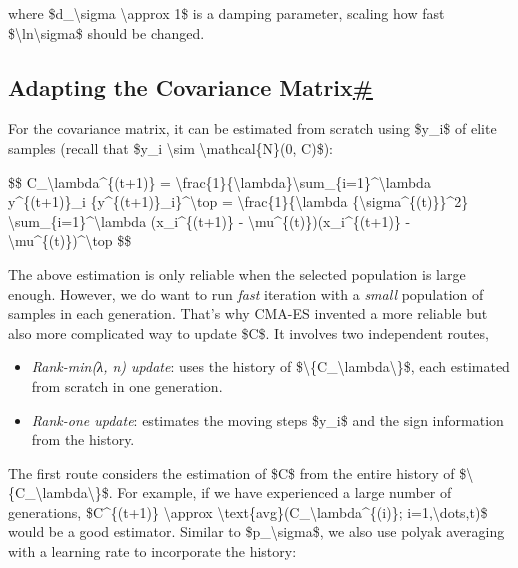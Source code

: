 where \$d\_\textbackslash sigma \textbackslash approx 1\$ is a damping parameter, scaling how fast \$\textbackslash ln\textbackslash sigma\$ should be changed.

\subsection{\texorpdfstring{Adapting the Covariance Matrix\hyperref[adapting-the-covariance-matrix]{\#}}{Adapting the Covariance Matrix\#}}\label{adapting-the-covariance-matrix}

For the covariance matrix, it can be estimated from scratch using \$y\_i\$ of elite samples (recall that \$y\_i \textbackslash sim \textbackslash mathcal\{N\}(0, C)\$):

\$\$ C\_\textbackslash lambda\^{}\{(t+1)\} = \textbackslash frac\{1\}\{\textbackslash lambda\}\textbackslash sum\_\{i=1\}\^{}\textbackslash lambda y\^{}\{(t+1)\}\_i \{y\^{}\{(t+1)\}\_i\}\^{}\textbackslash top = \textbackslash frac\{1\}\{\textbackslash lambda \{\textbackslash sigma\^{}\{(t)\}\}\^{}2\} \textbackslash sum\_\{i=1\}\^{}\textbackslash lambda (x\_i\^{}\{(t+1)\} - \textbackslash mu\^{}\{(t)\})(x\_i\^{}\{(t+1)\} - \textbackslash mu\^{}\{(t)\})\^{}\textbackslash top \$\$

The above estimation is only reliable when the selected population is large enough. However, we do want to run \emph{fast} iteration with a \emph{small} population of samples in each generation. That's why CMA-ES invented a more reliable but also more complicated way to update \$C\$. It involves two independent routes,

\begin{itemize}
\tightlist
\item
  \emph{Rank-min(λ, n) update}: uses the history of \$\textbackslash\{C\_\textbackslash lambda\textbackslash\}\$, each estimated from scratch in one generation.
\item
  \emph{Rank-one update}: estimates the moving steps \$y\_i\$ and the sign information from the history.
\end{itemize}

The first route considers the estimation of \$C\$ from the entire history of \$\textbackslash\{C\_\textbackslash lambda\textbackslash\}\$. For example, if we have experienced a large number of generations, \$C\^{}\{(t+1)\} \textbackslash approx \textbackslash text\{avg\}(C\_\textbackslash lambda\^{}\{(i)\}; i=1,\textbackslash dots,t)\$ would be a good estimator. Similar to \$p\_\textbackslash sigma\$, we also use polyak averaging with a learning rate to incorporate the history:

